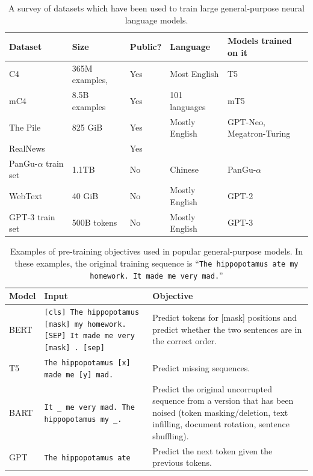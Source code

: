 \begin{itemize}
\begin{table}
  \centering
  \small
  \caption{A survey of datasets which have been used to train large general-purpose neural language models.}
  \label{tab:dataset_list}%
    \begin{tabular}{l|l|l|l|l}
    \toprule
    \textbf{Dataset} & \multicolumn{1}{l}{\textbf{Size}} & \multicolumn{1}{l}{\textbf{Public?}} & \textbf{Language} & \multicolumn{1}{l}{\textbf{Models trained on it}} \\
    \hline
    C4 \citep{raffel2019exploring}   &  365M examples,      & {Yes} & Most English & {T5} \\
    mC4 \citep{xue2020mt5}   &  8.5B examples  & {Yes} & 101 languages & {mT5} \\
    The Pile \citep{gao2020pile} & 825 GiB & {Yes} & Mostly English & {GPT-Neo, Megatron-Turing} \\
    RealNews &       & {Yes} &       \\
    PanGu-$\alpha$ train set & {1.1TB} & {No} & Chinese & {PanGu-$\alpha$} \\
    WebText &  40 GiB & {No} & Mostly English &  {GPT-2} \\
    GPT-3 train set & {500B tokens} & {No} & Mostly English & {GPT-3} \\
    \bottomrule
    \end{tabular}%
\end{table}%


\begin{table}
    \centering
    \small
    \caption{Examples of pre-training objectives used in popular general-purpose models.
    In these examples, the original training sequence is ``\texttt{The hippopotamus ate my homework. It made me very mad.}''}
    \label{tab:common_pretrained_models}
	\begin{tabular}{l|p{2in}|p{2in}}
        \toprule 
        \textbf{Model} & \textbf{Input} & \textbf{Objective} \\
        \hline
        BERT \citep{devlin2018bert} & \texttt{[cls] The hippopotamus [mask] my homework. [SEP] It made me very [mask] . [sep]} &  Predict tokens for [mask] positions and predict whether the two sentences are in the correct order.\\
	\midrule
        T5 \citep{raffel2019exploring} & \texttt{The hippopotamus [x] made me [y] mad.} & Predict missing sequences.  \\
	\midrule
        BART & \texttt{It \_ me very mad. The hippopotamus my \_.} &  Predict the original uncorrupted sequence from a version that has been noised (token masking/deletion, text infilling, document rotation, sentence shuffling). \\
	\midrule
        GPT \citep{radford2019language,brown2020language} & \texttt{The hippopotamus ate} & Predict the next token given the previous tokens.\\
        \bottomrule
    \end{tabular}
\end{table}


\end{itemize}

